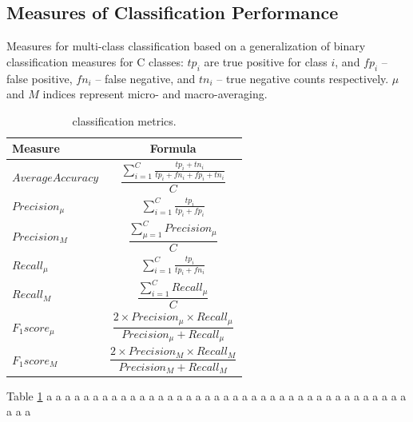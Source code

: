 \subsection{Measures of Classification Performance}
Measures for multi-class classification based on a generalization of binary classification measures for C classes: $tp_i$ are true positive for class $i$, and $fp_i$ – false positive, $fn_i$ – false negative, and $tn_i$ – true negative counts respectively. $\mu$ and $M$ indices represent micro- and macro-averaging.
\begin{table}[H]
	\begin{center}
	\begin{tabular}{|l|c|}
		\hline
		\textbf{Measure} & \textbf{Formula} \\ 
		\hline
		$Average Accuracy$ & $\dfrac{\sum_{i=1}^{C} \frac{tp_i+tn_i}{tp_i+fn_i+fp_i+tn_i}}{C}$ \\
		$Precision_\mu$ & $\sum_{i=1}^{C} \frac{tp_i}{tp_i+fp_i}$ \\
		$Precision_M$ & $\dfrac{\sum_{\mu=1}^{C} Precision_\mu}{C}$ \\
		$Recall_\mu$ & $\sum_{i=1}^{C} \frac{tp_i}{tp_i+fn_i}$ \\
		$Recall_M$ & $\dfrac{\sum_{i=1}^{C} Recall_\mu}{C}$ \\
		$F_1 score_\mu$ & $\dfrac{2\times Precision_\mu \times Recall_\mu}{Precision_\mu+Recall_\mu}$ \\
		$F_1 score_M$ & $\dfrac{2\times Precision_M \times Recall_M}{Precision_M+Recall_M}$ \\
		\hline
	\end{tabular}
	\end{center}
	\caption{classification metrics.}
	\label{table:1}
\end{table}
Table \ref{table:1} a a a a a a a a a a a a a a a a a a a a a a a a a a a a a a a a a a a a a a a a a a 